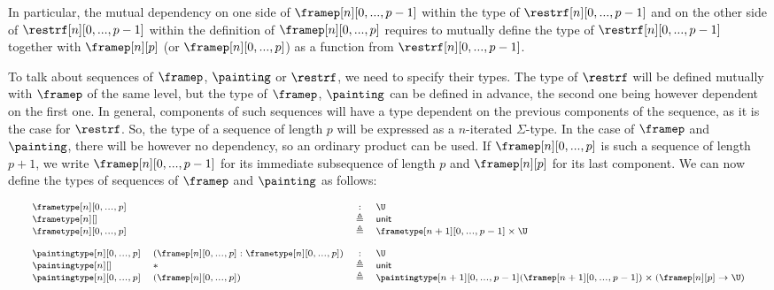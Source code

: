 \documentclass{msc}
\newcommand{\unittype}{\ensuremath{\mathsf{unit}}}
\newcommand{\unitpoint}{\ensuremath{\ast}}
\newcommand{\defeq}{\ensuremath{\triangleq}}
\begin{document}
In particular, the mutual dependency on one side of $\framep[n][0,...,p-1]$ within the type of $\restrf[n][0,...,p-1]$ and on the other side of $\restrf[n][0,...,p-1]$ within the definition of $\framep[n][0,...,p]$ requires to mutually define the type of $\restrf[n][0,...,p-1]$ together with $\framep[n][p]$ (or $\framep[n][0,...,p]$) as a function from $\restrf[n][0,...,p-1]$.

To talk about sequences of $\framep$, $\painting$ or $\restrf$, we need to specify their types. The type of $\restrf$ will be defined mutually with $\framep$ of the same level, but the type of $\framep$, $\painting$ can be defined in advance, the second one being however dependent on the first one. In general, components of such sequences will have a type dependent on the previous components of the sequence, as it is the case for $\restrf$. So, the type of a sequence of length $p$ will be expressed as a $n$-iterated $\Sigma$-type. In the case of $\framep$ and $\painting$, there will be however no dependency, so an ordinary product can be used. If $\framep[n][0,...,p]$ is such a sequence of length $p+1$, we write $\framep[n][0,...,p-1]$ for its immediate subsequence of length $p$ and $\framep[n][p]$ for its last component. We can now define the types of sequences of $\framep$ and $\painting$ as follows:

\begin{equation*}
  \fontsize{7.2}{9}\selectfont
  \begin{array}{llcl}
    \frametype[n][0,...,p]    &                                              & :      & \U                                                                                           \\
    \frametype[n][]           &                                              & \defeq & \unittype                                                                                    \\
    \frametype[n][0,...,p]    &                                              & \defeq & \frametype[n+1][0,...,p-1] \times \U                                                         \\
    \\
    \paintingtype[n][0,...,p] & (\framep[n][0,...,p]:\frametype[n][0,...,p]) & :      & \U                                                                                           \\
    \paintingtype[n][]        & \unitpoint                                   & \defeq & \unittype                                                                                    \\
    \paintingtype[n][0,...,p] & (\framep[n][0,...,p])                        & \defeq & \paintingtype[n+1][0,...,p-1](\framep[n+1][0,...,p-1]) \times (\framep[n][p] \rightarrow \U) \\
  \end{array}
\end{equation*}
\end{document}
